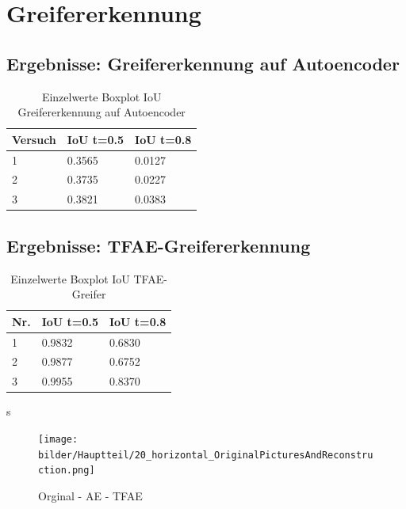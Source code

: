 \chapter{Greifererkennung}
\label{appendix:Greifererkennung}

\section{Ergebnisse: Greifererkennung auf Autoencoder}
\label{appendix:GreifererkennungAufAutoencoder}

\begin{table}[ht]
	\centering
	\begin{tabularx}{\textwidth}{lll}
		\textbf{Versuch}  & \textbf{IoU t=0.5} & \textbf{IoU t=0.8}  	 \\ \hline 
		1 & 0.3565 & 0.0127 \\
		2 & 0.3735 & 0.0227 \\
		3 & 0.3821 & 0.0383 \\ 
	\end{tabularx}
	\caption{Einzelwerte Boxplot IoU Greifererkennung auf Autoencoder}
	\label{table:EinzelwerteBoxplotIoUGreifererkennungaufAutoencoder}
\end{table}

\section{Ergebnisse: TFAE-Greifererkennung}
\label{appendix:MutliTaskGreifererkennung}

\begin{table}[ht]
	\centering
	\begin{tabularx}{\textwidth}{lll}
		\textbf{Nr.}  & \textbf{IoU t=0.5} & \textbf{IoU t=0.8}  	 \\ \hline 
		1 & 0.9832 & 0.6830 \\
		2 & 0.9877 & 0.6752 \\
		3 & 0.9955 & 0.8370 \\
	\end{tabularx}
	\caption{Einzelwerte Boxplot IoU TFAE-Greifer}
	\label{table:EinzelwerteBoxplotIoUMTGreifer}
\end{table}s

\begin{figure}[h]
	\centering
	\texttt{[image: bilder/Hauptteil/20\_horizontal\_OriginalPicturesAndReconstruction.png]}
	\caption{Orginal -  AE - TFAE}
	\label{img:AppendixReconstruction}	
\end{figure}

